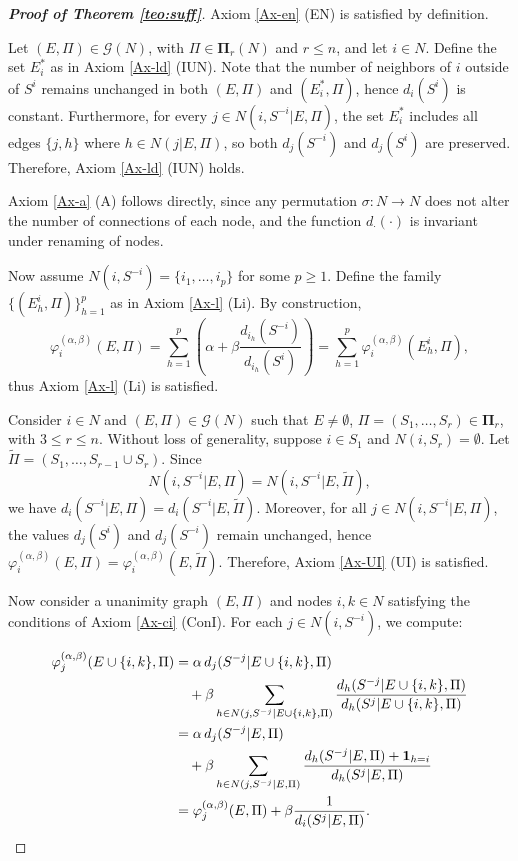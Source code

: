 \documentclass[preprint,11pt,authoryear]{elsarticle}
\theoremstyle{plain}
\begin{document}
\begin{proof}[\bf Proof of Theorem \ref{teo:suff}]
	
	Axiom \ref{Ax-en} (EN) is satisfied by definition.
	
	Let $(E,\Pi)\in\mathcal{G}(N)$, with $\Pi\in\mathbf{\Pi}_r(N)$ and $r\leq n$, and let $i\in N$. Define the set $E_i^*$ as in Axiom \ref{Ax-ld} (IUN). Note that the number of neighbors of $i$ outside of $S^i$ remains unchanged in both $(E,\Pi)$ and $(E_i^*,\Pi)$, hence 
	$d_i(S^i)$ is constant. Furthermore, for every $j\in N(i, S^{-i}|E,\Pi)$, the set $E_i^*$ includes all edges $\{j,h\}$ where $h \in N(j|E,\Pi)$, so both $d_j(S^{-i})$ and $d_j(S^i)$ are preserved. Therefore, Axiom \ref{Ax-ld} (IUN) holds.
	
	
	Axiom \ref{Ax-a} (A) follows directly, since any permutation $\sigma:N\to N$ does not alter the number of connections of each node, and the function $d_{\cdot}(\cdot)$ is invariant under renaming of nodes.
	
	
	Now assume $N(i, S^{-i}) = \{i_1,\ldots,i_p\}$ for some $p\geq 1$. Define the family $\{(E_h^i, \Pi)\}_{h=1}^p$ as in Axiom \ref{Ax-l} (Li). By construction,
	\[
	\varphi^{(\alpha,\beta)}_i(E,\Pi) = \sum_{h=1}^p \left(\alpha + \beta \frac{d_{i_h}( S^{-i})}{d_{i_h}( S^i)}\right) = \sum_{h=1}^p \varphi^{(\alpha,\beta)}_i(E_h^i,\Pi),
	\]
	thus Axiom \ref{Ax-l} (Li) is satisfied.
	
	Consider $i\in N$ and $(E,\Pi)\in\mathcal{G}(N)$ such that $E \neq \emptyset$, $\Pi = (S_1,\ldots,S_r) \in \bm{\Pi}_r$, with $3 \leq r \leq n$. Without loss of generality, suppose $i\in S_1$ and $N(i, S_r) = \emptyset$. Let $\tilde{\Pi} = (S_1, \ldots, S_{r-1} \cup S_r)$. Since
	\[
	N(i, S^{-i}|E, \Pi) = N(i, S^{-i}|E, \tilde{\Pi}),
	\]
	we have $d_{i}(S^{-i}|E,\Pi) = d_{i}(S^{-i}|E,\tilde{\Pi})$. Moreover, for all $j \in N(i, S^{-i}|E,\Pi)$, the values $d_j (S^i)$ and $d_j( S^{-i})$ remain unchanged, hence $\varphi_i^{(\alpha,\beta)}(E,\Pi) = \varphi_i^{(\alpha,\beta)}(E,\tilde{\Pi})$. Therefore, Axiom \ref{Ax-UI} (UI) is satisfied.
	
	Now consider a unanimity graph $(E,\Pi)$ and nodes $i,k \in N$ satisfying the conditions of Axiom \ref{Ax-ci} (ConI). For each $j \in N(i, S^{-i})$, we compute:
	
	\begin{align*}
		\varphi_j^{(\alpha,\beta)}(E \cup \{i,k\}, \Pi) 
		&= \alpha \, d_j (S^{-j}|E \cup \{i,k\}, \Pi) \notag \\
		&\quad 
		+ \beta \sum_{h \in N(j, S^{-j}|E \cup \{i,k\}, \Pi)} 
		\frac{d_h(S^{-j}|E \cup \{i,k\}, \Pi)}{d_h (S^j|E \cup \{i,k\}, \Pi)} \notag \\
		&= \alpha \, d_j (S^{-j}|E, \Pi) \notag \\
		&\quad 
		+ \beta \sum_{h \in N(j, S^{-j}|E, \Pi)} 
		\frac{d_h(S^{-j}|E, \Pi) + \mathbf{1}_{h = i}}{d_h (S^j|E, \Pi)} \notag \\
		&= \varphi_j^{(\alpha,\beta)}(E, \Pi) 
		+ \beta \frac{1}{d_i (S^j|E, \Pi)}.
	\end{align*}
	

\end{proof}
\end{document}
